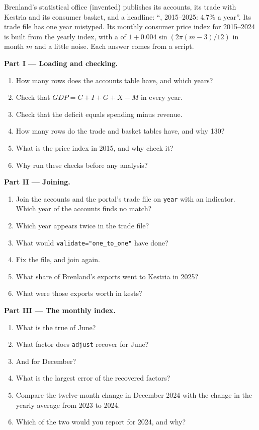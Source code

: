 \begin{problem}\label{pb:b1:economic-data-python:portal}
Brenland's statistical office (invented) publishes its accounts, its trade
with Kestria and its consumer basket, and a headline: ``,
2015--2025: $4.7\%$ a year''. Its trade file has one year mistyped. Its monthly
consumer price index for 2015--2024 is built from the yearly index, with a
 of $1 + 0.004\sin(2\pi(m - 3)/12)$ in month $m$ and a little noise. Each
answer comes from a script.

\medskip\noindent\textbf{Part I --- Loading and checking.}
\begin{enumerate}
  \item How many rows does the accounts table have, and which years?
  \item Check that $GDP = C + I + G + X - M$ in every year.
  \item Check that the deficit equals spending minus revenue.
  \item How many rows do the trade and basket tables have, and why 130?
  \item What is the price index in 2015, and why check it?
  \item Why run these checks before any analysis?
\end{enumerate}

\medskip\noindent\textbf{Part II --- Joining.}
\begin{enumerate}[resume]
  \item Join the accounts and the portal's trade file on \texttt{year} with an
    indicator. Which year of the accounts finds no match?
  \item Which year appears twice in the trade file?
  \item What would \texttt{validate="one\_to\_one"} have done?
  \item Fix the file, and join again.
  \item What share of Brenland's exports went to Kestria in 2025?
  \item What were those exports worth in kests?
\end{enumerate}

\medskip\noindent\textbf{Part III --- The monthly index.}
\begin{enumerate}[resume]
  \item What is the true  of June?
  \item What factor does \texttt{adjust} recover for June?
  \item And for December?
  \item What is the largest error of the recovered factors?
  \item Compare the twelve-month change in December 2024 with the change in
    the yearly average from 2023 to 2024.
  \item Which of the two would you report for 2024, and why?
\end{enumerate}


\end{problem}
